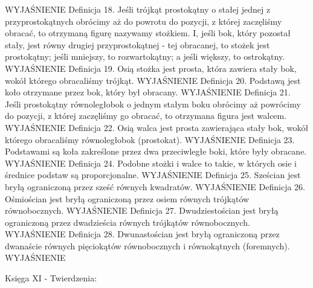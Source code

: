     WYJAŚNIENIE
Definicja 18.
    Jeśli trójkąt prostokątny o stałej jednej z przyprostokątnych obrócimy aż do powrotu do pozycji, z której zaczęliśmy obracać, to otrzymaną figurę nazywamy stożkiem. I, jeśli bok, który pozostał stały, jest równy drugiej przyprostokątnej - tej obracanej, to stożek jest prostokątny; jeśli mniejszy, to rozwartokątny; a jeśli większy, to ostrokątny.
    WYJAŚNIENIE
Definicja 19.
    Osią stożka jest prosta, która zawiera stały bok, wokół którego obracaliśmy trójkąt.
    WYJAŚNIENIE
Definicja 20.
    Podstawą jest koło otrzymane przez bok, który był obracany.
    WYJAŚNIENIE
Definicja 21.
    Jeśli prostokątny równoległobok o jednym stałym boku obrócimy aż powrócimy do pozycji, z której zaczęliśmy go obracać, to otrzymana figura jest walcem.
    WYJAŚNIENIE
Definicja 22.
    Osią walca jest prosta zawierająca stały bok, wokół którego obracaliśmy równoległobok (prostokat).
    WYJAŚNIENIE
Definicja 23.
    Podstawami są koła zakreślone przez dwa przeciwległe boki, które były obracane.
    WYJAŚNIENIE
Definicja 24.
    Podobne stożki i walce to takie, w których osie i średnice podstaw są proporcjonalne.
    WYJAŚNIENIE
Definicja 25.
    Sześcian jest bryłą ograniczoną przez sześć równych kwadratów.
    WYJAŚNIENIE
Definicja 26.
    Ośmiościan jest bryłą ograniczoną przez osiem równych trójkątów równobocznych.
    WYJAŚNIENIE
Definicja 27.
    Dwudziestościan jest bryłą ograniczoną przez dwadzieścia równych trójkątów równobocznych.
    WYJAŚNIENIE
Definicja 28.
    Dwunastościan jest bryłą ograniczoną przez dwanaście równych pięciokątów równobocznych i równokątnych (foremnych).
    WYJAŚNIENIE


Księga XI - Twierdzenia:

